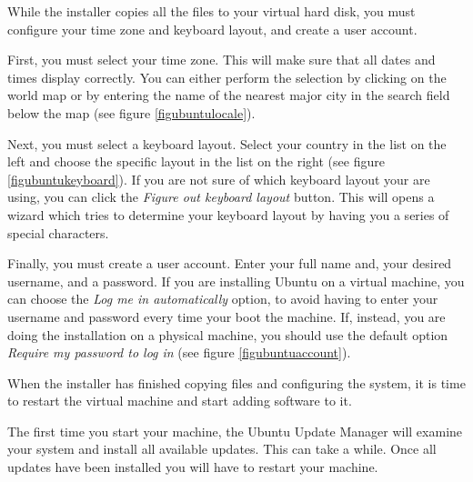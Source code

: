 \documentclass[final,ebook,10pt,twoside,openright]{memoir}
\begin{document}
While the installer copies all the files to your virtual hard disk, you must configure your time zone and keyboard layout, and create a user account.

First, you must select your time zone. This will make sure that all dates and times display correctly. You can either perform the selection by clicking on the world map or by entering the name of the nearest major city in the search field below the map (see figure \ref{figubuntulocale}).


Next, you must select a keyboard layout. Select your country in the list on the left and choose the specific layout in the list on the right (see figure \ref{figubuntukeyboard}). If you are not sure of which keyboard layout your are using, you can click the \emph{Figure out keyboard layout} button. This will opens a wizard which tries to determine your keyboard layout by having you a series of special characters.


Finally, you must create a user account. Enter your full name and, your desired username, and a password. If you are installing Ubuntu on a virtual machine, you can choose the \emph{Log me in automatically} option, to avoid having to enter your username and password every time your boot the machine. If, instead, you are doing the installation on a physical machine, you should use the default option \emph{Require my password to log in} (see figure \ref{figubuntuaccount}).


When the installer has finished copying files and configuring the system, it is time to restart the virtual machine and start adding software to it.

The first time you start your machine, the Ubuntu Update Manager will examine your system and install all available updates. This can take a while. Once all updates have been installed you will have to restart your machine.

\end{document}
